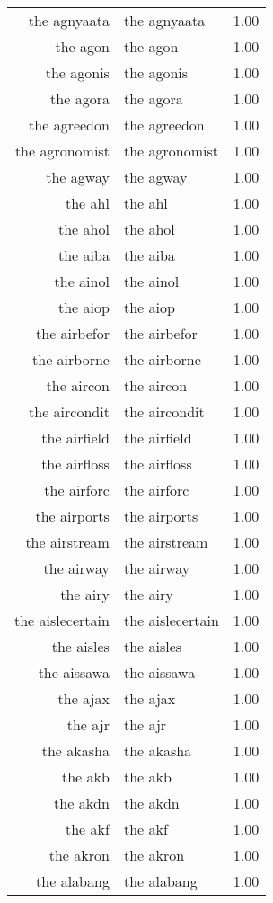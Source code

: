\begin{table}[ht]
\begin{tabular}{rlr}
  the agnyaata & the agnyaata & 1.00 \\ 
  the agon & the agon & 1.00 \\ 
  the agonis & the agonis & 1.00 \\ 
  the agora & the agora & 1.00 \\ 
  the agreedon & the agreedon & 1.00 \\ 
  the agronomist & the agronomist & 1.00 \\ 
  the agway & the agway & 1.00 \\ 
  the ahl & the ahl & 1.00 \\ 
  the ahol & the ahol & 1.00 \\ 
  the aiba & the aiba & 1.00 \\ 
  the ainol & the ainol & 1.00 \\ 
  the aiop & the aiop & 1.00 \\ 
  the airbefor & the airbefor & 1.00 \\ 
  the airborne & the airborne & 1.00 \\ 
  the aircon & the aircon & 1.00 \\ 
  the aircondit & the aircondit & 1.00 \\ 
  the airfield & the airfield & 1.00 \\ 
  the airfloss & the airfloss & 1.00 \\ 
  the airforc & the airforc & 1.00 \\ 
  the airports & the airports & 1.00 \\ 
  the airstream & the airstream & 1.00 \\ 
  the airway & the airway & 1.00 \\ 
  the airy & the airy & 1.00 \\ 
  the aislecertain & the aislecertain & 1.00 \\ 
  the aisles & the aisles & 1.00 \\ 
  the aissawa & the aissawa & 1.00 \\ 
  the ajax & the ajax & 1.00 \\ 
  the ajr & the ajr & 1.00 \\ 
  the akasha & the akasha & 1.00 \\ 
  the akb & the akb & 1.00 \\ 
  the akdn & the akdn & 1.00 \\ 
  the akf & the akf & 1.00 \\ 
  the akron & the akron & 1.00 \\ 
  the alabang & the alabang & 1.00 \\ 

\end{tabular}
\end{table}
